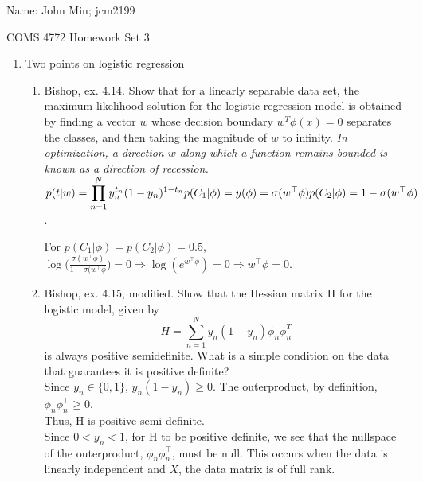 \documentclass[12pt]{amsart}
\begin{document}
{\Large Name:}  John Min; jcm2199\\
\begin{center}
\Large COMS 4772 \hskip 2in Homework Set 3
\end{center}
\bigskip



\noindent

\begin{enumerate}

\item Two points on logistic regression

\begin{enumerate}

\item Bishop, ex. 4.14. Show that for a linearly separable data set, the maximum likelihood solution for the logistic regression model is obtained by 
finding a vector $w$ whose decision boundary $w^T \phi(x) = 0$ separates the classes, and then taking the magnitude of $w$ to infinity. 
{\it In optimization, a direction $w$ along which a function remains bounded is known as a direction of recession.}\\

$\displaystyle p(t|w) = \prod_{n=1}^{N} y_n^{t_n} (1-y_n)^{1-t_n} \\
p(C_1|\phi) = y(\phi) = \sigma(w^\top \phi) \\
p(C_2| \phi) = 1 - \sigma(w^\top \phi)$.

For $p(C_1 | \phi) = p(C_2 | \phi) = 0.5$, $\log \bigg( \frac{\sigma(w^\top \phi)}{1 - \sigma(w^\top \phi} \bigg) = 0 \Rightarrow \log(e^{w^\top \phi}) = 0 \Rightarrow w^\top \phi = 0.$ \\



\item Bishop, ex. 4.15, modified. Show that the Hessian matrix H for the logistic model, given by
\[
H = \sum_{n=1}^N y_n (1-y_n) \phi_n \phi_n^T
\]
is always positive semidefinite. What is a simple condition on the data that guarantees it is positive definite? \\

\noindent
Since $y_n \in \{0,1\}$, $y_n (1-y_n) \geq 0$.  The outerproduct, by definition, $\phi_n \phi_n^\top \geq 0$. \\
Thus, H is positive semi-definite.\\
Since $0 < y_n < 1$, for H to be positive definite, we see that the nullspace of the outerproduct, $\phi_n \phi_n^\top$, must be null.  This occurs when the data is linearly independent and $X$, the data matrix is of full rank. \\


\end{enumerate}
\end{enumerate}
\end{document}
